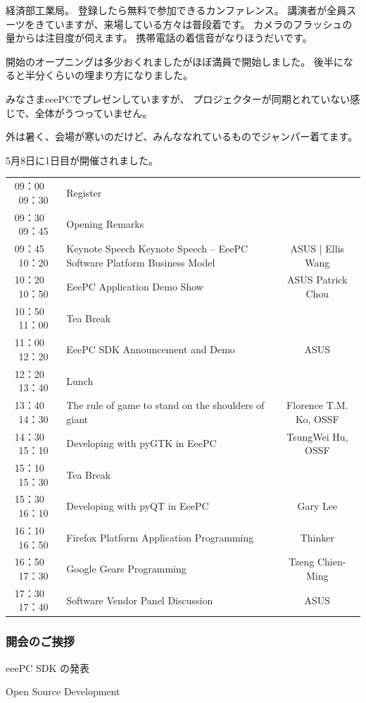 \documentclass[mingoth,a4paper]{jsarticle}
\begin{document}
経済部工業局。
登録したら無料で参加できるカンファレンス。
講演者が全員スーツをきていますが、来場している方々は普段着です。
カメラのフラッシュの量からは注目度が伺えます。
携帯電話の着信音がなりほうだいです。

開始のオープニングは多少おくれましたがほぼ満員で開始しました。
後半になると半分くらいの埋まり方になりました。

みなさまeeePCでプレゼンしていますが、
プロジェクターが同期とれていない感じで、全体がうつっていません。

外は暑く、会場が寒いのだけど、みんななれているものでジャンパー着てます。

5月8日に1日目が開催されました。

\begin{tabular}{|c|p{18em}|c|}
09：00 ~ 09：30 & 	 Register & \\
09：30 ~ 09：45 &	Opening Remarks & \\
09：45 ~ 10：20 &	Keynote Speech Keynote Speech -- EeePC Software Platform Business Model &	ASUS | Ellis Wang\\
10：20 ~ 10：50 &	EeePC Application Demo Show &	ASUS  Patrick Chou\\
10：50 ~ 11：00 &	Tea Break &\\
11：00 ~ 12：20 &	EeePC SDK Announcement and Demo &	ASUS\\
12：20 ~ 13：40 &	Lunch &\\
13：40 ~ 14：30 &	The rule of game to stand on the shoulders of giant 	&Florence T.M. Ko, OSSF\\
14：30 ~ 15：10 &	Developing with pyGTK in EeePC 	&TsungWei Hu, OSSF\\
15：10 ~ 15：30 &	Tea Break &\\
15：30 ~ 16：10 &	Developing with pyQT in EeePC 	&Gary Lee\\
16：10 ~ 16：50 &	Firefox Platform Application Programming 	&Thinker\\
16：50 ~ 17：30 &	Google Gears Programming 	&Tzeng Chien-Ming\\
17：30 ~ 17：40 &	Software Vendor Panel Discussion 	&ASUS\\
\end{tabular}


\subsubsection{開会のご挨拶}

eeePC SDK の発表

Open Source Development
\end{document}
